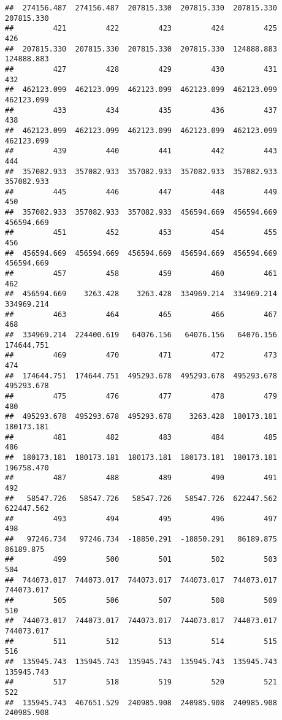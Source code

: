 \documentclass[
]{book}
\begin{document}
\begin{verbatim}
##  274156.487  274156.487  207815.330  207815.330  207815.330  207815.330 
##         421         422         423         424         425         426 
##  207815.330  207815.330  207815.330  207815.330  124888.883  124888.883 
##         427         428         429         430         431         432 
##  462123.099  462123.099  462123.099  462123.099  462123.099  462123.099 
##         433         434         435         436         437         438 
##  462123.099  462123.099  462123.099  462123.099  462123.099  462123.099 
##         439         440         441         442         443         444 
##  357082.933  357082.933  357082.933  357082.933  357082.933  357082.933 
##         445         446         447         448         449         450 
##  357082.933  357082.933  357082.933  456594.669  456594.669  456594.669 
##         451         452         453         454         455         456 
##  456594.669  456594.669  456594.669  456594.669  456594.669  456594.669 
##         457         458         459         460         461         462 
##  456594.669    3263.428    3263.428  334969.214  334969.214  334969.214 
##         463         464         465         466         467         468 
##  334969.214  224400.619   64076.156   64076.156   64076.156  174644.751 
##         469         470         471         472         473         474 
##  174644.751  174644.751  495293.678  495293.678  495293.678  495293.678 
##         475         476         477         478         479         480 
##  495293.678  495293.678  495293.678    3263.428  180173.181  180173.181 
##         481         482         483         484         485         486 
##  180173.181  180173.181  180173.181  180173.181  180173.181  196758.470 
##         487         488         489         490         491         492 
##   58547.726   58547.726   58547.726   58547.726  622447.562  622447.562 
##         493         494         495         496         497         498 
##   97246.734   97246.734  -18850.291  -18850.291   86189.875   86189.875 
##         499         500         501         502         503         504 
##  744073.017  744073.017  744073.017  744073.017  744073.017  744073.017 
##         505         506         507         508         509         510 
##  744073.017  744073.017  744073.017  744073.017  744073.017  744073.017 
##         511         512         513         514         515         516 
##  135945.743  135945.743  135945.743  135945.743  135945.743  135945.743 
##         517         518         519         520         521         522 
##  135945.743  467651.529  240985.908  240985.908  240985.908  240985.908 

\end{verbatim}
\end{document}
